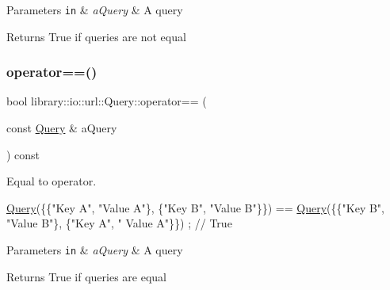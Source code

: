 \begin{DoxyParams}[1]{Parameters}
\mbox{\tt in}  & {\em a\+Query} & A query \\
\hline
\end{DoxyParams}
\begin{DoxyReturn}{Returns}
True if queries are not equal 
\end{DoxyReturn}
\mbox{\label{classlibrary_1_1io_1_1url_1_1_query_a7aa536f75df48e4ff7be3369d7f314ec}} 
\subsubsection{\texorpdfstring{operator==()}{operator==()}}
{\footnotesize\ttfamily bool library\+::io\+::url\+::\+Query\+::operator== (\begin{DoxyParamCaption}\item[{const \hyperlink{classlibrary_1_1io_1_1url_1_1_query}{Query} \&}]{a\+Query }\end{DoxyParamCaption}) const}



Equal to operator. 


\begin{DoxyCode}
\hyperlink{classlibrary_1_1io_1_1url_1_1_query_a6781de8f7b7251f8e17c191434b08039}{Query}(\{\{\textcolor{stringliteral}{"Key A"}, \textcolor{stringliteral}{"Value A"}\}, \{\textcolor{stringliteral}{"Key B"}, \textcolor{stringliteral}{"Value B"}\}\}) == \hyperlink{classlibrary_1_1io_1_1url_1_1_query_a6781de8f7b7251f8e17c191434b08039}{Query}(\{\{\textcolor{stringliteral}{"Key B"}, \textcolor{stringliteral}{"Value B"}\}, \{\textcolor{stringliteral}{"Key A"}, \textcolor{stringliteral}{"
      Value A"}\}\}) ; \textcolor{comment}{// True}
\end{DoxyCode}



\begin{DoxyParams}[1]{Parameters}
\mbox{\tt in}  & {\em a\+Query} & A query \\
\hline
\end{DoxyParams}
\begin{DoxyReturn}{Returns}
True if queries are equal 
\end{DoxyReturn}
\mbox{\label{classlibrary_1_1io_1_1url_1_1_query_a52a7b884fbf52bb9bc449e5f314c3199}} 
